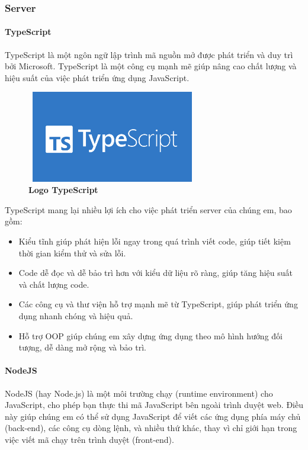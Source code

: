 \subsubsection{Server}
\paragraph{TypeScript}
\mbox{}

TypeScript là một ngôn ngữ lập trình mã nguồn mở được phát triển và duy trì bởi Microsoft. TypeScript là một công cụ mạnh mẽ giúp nâng cao chất lượng và hiệu suất của việc phát triển ứng dụng JavaScript.

\begin{figure}[H]
	\centering
	\includegraphics[width=7.5cm,height=4cm]{Images/Technology/typescript.png}
	\caption[Logo TypeScript]{\bfseries \fontsize{12pt}{0pt}
		\selectfont Logo TypeScript}
	\label{typescript} %
\end{figure}

TypeScript mang lại nhiều lợi ích cho việc phát triển server của chúng em, bao gồm:
\begin{itemize}
	\item Kiểu tĩnh giúp phát hiện lỗi ngay trong quá trình viết code, giúp tiết kiệm thời gian kiểm thử và sửa lỗi.
	\item Code dễ đọc và dễ bảo trì hơn với kiểu dữ liệu rõ ràng, giúp tăng hiệu suất và chất lượng code.
	\item Các công cụ và thư viện hỗ trợ mạnh mẽ từ TypeScript, giúp phát triển ứng dụng nhanh chóng và hiệu quả.
	\item Hỗ trợ OOP giúp chúng em xây dựng ứng dụng theo mô hình hướng đối tượng, dễ dàng mở rộng và bảo trì.
\end{itemize}

\paragraph{NodeJS}
\mbox{}

NodeJS (hay Node.js) là một môi trường chạy (runtime environment) cho JavaScript, cho phép bạn thực thi mã JavaScript bên ngoài trình duyệt web. Điều này giúp chúng em có thể sử dụng JavaScript để viết các ứng dụng phía máy chủ (back-end), các công cụ dòng lệnh, và nhiều thứ khác, thay vì chỉ giới hạn trong việc viết mã chạy trên trình duyệt (front-end).

